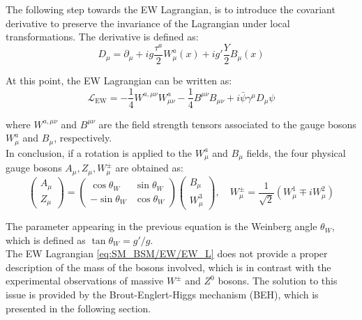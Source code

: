 \noindent The following step towards the EW Lagrangian, is to introduce the covariant derivative to preserve the invariance of the Lagrangian under local transformations. The derivative is defined as:
\begin{equation}\label{eq:SM_BSM/EW/cov_der}
    D_\mu = \partial_\mu + i g \frac{\tau^a}{2} W_\mu^a(x) + i g' \frac{Y}{2} B_\mu(x)
\end{equation}

\noindent At this point, the EW Lagrangian can be written as:
\begin{equation}\label{eq:SM_BSM/EW/EW_L}
    \mathcal{L}_\text{EW} = -\frac{1}{4} W^{a,\mu\nu} W^a_{\mu\nu} -\frac{1}{4} B^{\mu\nu} B_{\mu\nu}+ i\bar{\psi} \gamma^\mu D_\mu \psi
\end{equation}

\noindent where $W^{a,\mu\nu}$ and $B^{\mu\nu}$ are the field strength tensors associated to the gauge bosons $W^a_\mu$ and $B_\mu$, respectively.\\
In conclusion, if a rotation is applied to the $W^a_\mu$ and $B_\mu$ fields, the four physical gauge bosons $A_{\mu}, Z_{\mu}, W^{\pm}_{\mu}$ are obtained as:
\begin{equation}\label{eq:SM_BSM/EW/phys_bosons}
    \begin{pmatrix} A_\mu \\ Z_\mu \end{pmatrix} = \begin{pmatrix} \cos\theta_W & \sin\theta_W \\ -\sin\theta_W & \cos\theta_W \end{pmatrix} \begin{pmatrix} B_\mu \\ W_\mu^3 \end{pmatrix}, \quad W_\mu^\pm = \frac{1}{\sqrt{2}}(W_\mu^1 \mp i W_\mu^2)
\end{equation}

\noindent The parameter appearing in the previous equation is the Weinberg angle $\theta_W$, which is defined as $\tan\theta_W = g'/g$.\\ 
The EW Lagrangian \ref{eq:SM_BSM/EW/EW_L} does not provide a proper description of the mass of the bosons involved, which is in contrast with the experimental observations of massive $W^\pm$ and $Z^0$ bosons. The solution to this issue is provided by the Brout-Englert-Higgs mechanism (BEH), which is presented in the following section.

